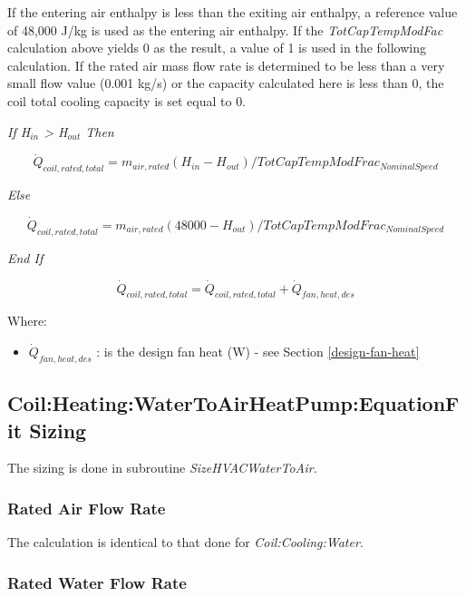 If the entering air enthalpy is less than the exiting air enthalpy, a reference value of 48,000 J/kg is used as the entering air enthalpy. If the \emph{TotCapTempModFac} calculation above yields 0 as the result, a value of 1 is used in the following calculation. If the rated air mass flow rate is determined to be less than a very small flow value (0.001 kg/s) or the capacity calculated here is less than 0, the coil total cooling capacity is set equal to 0.

\emph{If H\(_{in}\) \textgreater{} H\(_{out}\) Then}

\begin{equation}
{\dot {Q}_{coil,rated,total}} = {m_{air,rated}}({H_{in}} - {H_{out}})/TotCapTempModFra{c_{NominalSpeed}}
\end{equation}

\emph{Else}

\begin{equation}
{\dot {Q}_{coil,rated,total}} = {m_{air,rated}}(48000 - {H_{out}})/TotCapTempModFra{c_{NominalSpeed}}
\end{equation}

\emph{End If}

\begin{equation}
{\dot{Q}_{coil,rated,total}} = {\dot{Q}_{coil,rated,total}} + \dot{Q}_{fan,heat,des}
\end{equation}

Where:

\begin{itemize}
\item
  \(\dot{Q}_{fan,heat,des}\) : is the design fan heat (W) - see Section \ref{design-fan-heat}
\end{itemize}

\subsection{Coil:Heating:WaterToAirHeatPump:EquationFit Sizing}\label{coilheatingwatertoairheatpumpequationfit-sizing}

The sizing is done in subroutine \emph{SizeHVACWaterToAir.}

\subsubsection{Rated Air Flow Rate}\label{rated-air-flow-rate-2}

The calculation is identical to that done for \emph{Coil:Cooling:Water}.

\subsubsection{Rated Water Flow Rate}\label{rated-water-flow-rate-2}

